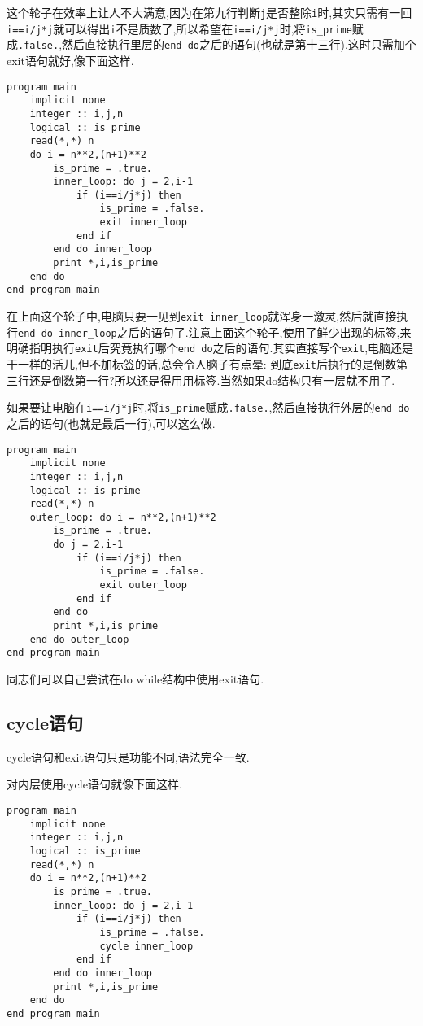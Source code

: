 这个轮子在效率上让人不大满意,因为在第九行判断\texttt{j}是否整除\texttt{i}时,其实只需有一回\texttt{i==i/j*j}就可以得出\texttt{i}不是质数了,所以希望在\texttt{i==i/j*j}时,将\texttt{is\_{}prime}赋成\texttt{.false.},然后直接执行里层的\texttt{end do}之后的语句(也就是第十三行).这时只需加个exit语句就好,像下面这样.
\begin{lstlisting}
program main
    implicit none
    integer :: i,j,n
    logical :: is_prime
    read(*,*) n
    do i = n**2,(n+1)**2
        is_prime = .true.
        inner_loop: do j = 2,i-1
            if (i==i/j*j) then
                is_prime = .false.
                exit inner_loop
            end if
        end do inner_loop
        print *,i,is_prime
    end do
end program main
\end{lstlisting}

在上面这个轮子中,电脑只要一见到\texttt{exit inner\_{}loop}就浑身一激灵,然后就直接执行\texttt{end do inner\_{}loop}之后的语句了.注意上面这个轮子,使用了鲜少出现的标签,来明确指明执行\texttt{exit}后究竟执行哪个\texttt{end do}之后的语句.其实直接写个\texttt{exit},电脑还是干一样的活儿,但不加标签的话,总会令人脑子有点晕: 到底\texttt{exit}后执行的是倒数第三行还是倒数第一行?所以还是得用用标签.当然如果do结构只有一层就不用了.

如果要让电脑在\texttt{i==i/j*j}时,将\texttt{is\_{}prime}赋成\texttt{.false.},然后直接执行外层的\texttt{end do}之后的语句(也就是最后一行),可以这么做.
\begin{lstlisting}
program main
    implicit none
    integer :: i,j,n
    logical :: is_prime
    read(*,*) n
    outer_loop: do i = n**2,(n+1)**2
        is_prime = .true.
        do j = 2,i-1
            if (i==i/j*j) then
                is_prime = .false.
                exit outer_loop
            end if
        end do
        print *,i,is_prime
    end do outer_loop
end program main
\end{lstlisting}

同志们可以自己尝试在do while结构中使用exit语句.

\subsection{cycle语句}\label{fortran_cycle}

cycle语句和exit语句只是功能不同,语法完全一致.

对内层使用cycle语句就像下面这样.
\begin{lstlisting}
program main
    implicit none
    integer :: i,j,n
    logical :: is_prime
    read(*,*) n
    do i = n**2,(n+1)**2
        is_prime = .true.
        inner_loop: do j = 2,i-1
            if (i==i/j*j) then
                is_prime = .false.
                cycle inner_loop
            end if
        end do inner_loop
        print *,i,is_prime
    end do
end program main
\end{lstlisting}

